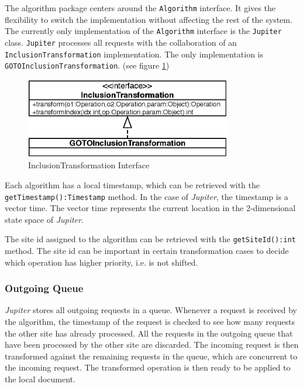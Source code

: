 The algorithm package centers around the \texttt{Algorithm} interface.
It gives the flexibility to switch the implementation without affecting the 
rest of the system. The currently only implementation of the \texttt{Algorithm} 
interface is the \texttt{Jupiter} class. \texttt{Jupiter} processes 
all requests with the collaboration of an \texttt{InclusionTransformation}
implementation. The only implementation is \texttt{GOTOInclusionTransformation}. (see figure \ref{fig:algorithm.transformation.uml})

\begin{figure}
\centering
\includegraphics[width=9cm,height=3.49cm]{../images/finalreport/algorithm_transformation.eps}
\caption{InclusionTransformation Interface}
\label{fig:algorithm.transformation.uml}
\end{figure}

Each algorithm has a local timestamp, which can be retrieved with the
\texttt{getTimestamp():Timestamp} method. In the 
case of \emph{Jupiter}, the timestamp is a vector time. The vector 
time represents the current location in the 2-dimensional state space of 
\emph{Jupiter}. 

The site id assigned to the algorithm can be retrieved with the
\texttt{getSiteId():int} method. The site id can be important in certain
transformation cases to decide which operation has higher priority, i.e.
is not shifted.

\subsubsection{Outgoing Queue}
\label{sect:algorithm.outgoingqueue}
\emph{Jupiter} stores all outgoing requests in a queue. Whenever a request
is received by the algorithm, the timestamp of the request is checked to
see how many requests the other site has already processed. All the requests
in the outgoing queue that have been processed by the other site are discarded.
The incoming request is then transformed against the remaining 
requests in the queue, which are concurrent to the incoming request. 
The transformed operation is then ready to be applied to the
local document.

